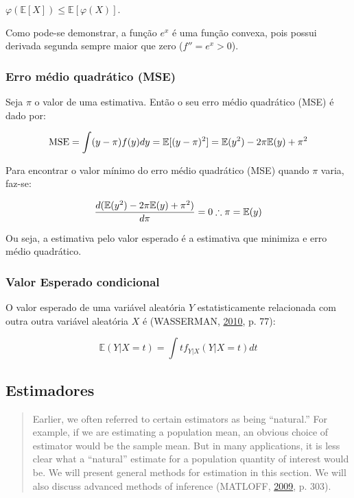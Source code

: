 \documentclass[a4paper, 12pt]{article}
\begin{document}
\(\varphi \left(\mathbb{E} [X]\right)\leq \mathbb{E} \left[\varphi (X)\right].\)

Como pode-se demonstrar, a função \(e^x\) é uma função convexa, pois
possui derivada segunda sempre maior que zero (\({f}''=e^x>0\)).

\subsubsection{Erro médio quadrático
(MSE)}\label{erro-medio-quadratico-mse}

Seja \(\pi\) o valor de uma estimativa. Então o seu erro médio
quadrático (MSE) é dado por:

\[\text{MSE} = \int(y - \pi)f(y)dy\\
= \mathbb{E}[(y-\pi)^2]\\
= \mathbb{E}(y^2)-2\pi \mathbb{E}(y)+\pi^2\]

Para encontrar o valor mínimo do erro médio quadrático (MSE) quando
\(\pi\) varia, faz-se:

\[\frac{d(\mathbb{E}(y^2)-2\pi \mathbb{E}(y)+\pi^2)}{d\pi} = 0\\
\therefore \pi = \mathbb{E}(y)\]

Ou seja, a estimativa pelo valor esperado é a estimativa que minimiza e
erro médio quadrático.

\subsubsection{Valor Esperado
condicional}\label{valor-esperado-condicional}

O valor esperado de uma variável aleatória \(Y\) estatisticamente
relacionada com outra outra variável aleatória \(X\) é (WASSERMAN,
\protect\hyperlink{ref-wasserman}{2010}, p. 77):

\[\mathbb{E}(Y|X = t) = \int{t} f_{Y|X}(Y|X = t)dt\]

\subsection{Estimadores}\label{estimadores}

\begin{quote}
Earlier, we often referred to certain estimators as being ``natural.''
For example, if we are estimating a population mean, an obvious choice
of estimator would be the sample mean. But in many applications, it is
less clear what a ``natural'' estimate for a population quantity of
interest would be. We will present general methods for estimation in
this section. We will also discuss advanced methods of inference
(MATLOFF, \protect\hyperlink{ref-matloff2009}{2009}, p. 303).
\end{quote}
\end{document}
